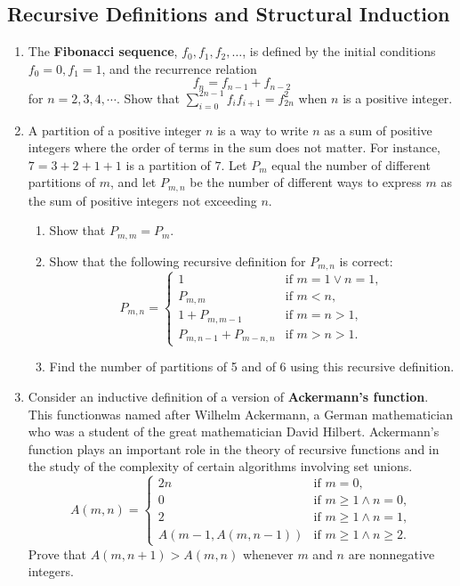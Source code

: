 \documentclass{../../cls/sig-alternate-05-2015}
\begin{document}
\subsection{Recursive Definitions and Structural Induction}
\begin{enumerate}
\item The \textbf{Fibonacci sequence},
$f_0, f_1, f_2, \ldots$,
is defined by the initial conditions $f_0 = 0, f_1 = 1$,
and the recurrence relation \begin{equation}
    f_n = f_{n - 1} + f_{n - 2}
\end{equation} for $n = 2, 3, 4, \cdots$.
Show that $\sum_{i = 0}^{2n - 1} f_i f_{i + 1} = f_{2n}^2$ when $n$ is a positive integer.

\item A partition of a positive integer $n$ is a way to write $n$ as a sum of positive integers where the order of terms in
the sum does not matter.
For instance, $7 = 3 + 2 + 1 + 1$ is a partition of $7$.
Let $P_m$ equal the number of different partitions of $m$,
and let $P_{m, n}$ be the number of different ways to express $m$ as the sum of positive integers not exceeding $n$. \begin{enumerate}
    \item Show that $P_{m, m} = P_m$.
    \item Show that the following recursive definition for $P_{m, n}$ is correct: \begin{equation}
        P_{m, n} = \begin{cases}
        1 & \text{if } m = 1 \lor n = 1,\\
        P_{m, m} & \text{if } m < n,\\
        1 + P_{m, m - 1} & \text{if } m = n > 1,\\
        P_{m, n - 1} + P_{m - n, n} & \text{if } m > n > 1.
        \end{cases}
    \end{equation}
    \item Find the number of partitions of 5 and of 6 using this recursive definition.
\end{enumerate}

\item Consider an inductive definition of a version of \textbf{Ackermann's function}.
This functionwas named after Wilhelm Ackermann,
a German mathematician who was a student of the great mathematician David Hilbert.
Ackermann's function plays an important role in the theory of recursive functions and in the study of the complexity of certain algorithms involving set unions.
\begin{equation}
    A(m, n) = \begin{cases}
    2n & \text{if } m = 0,\\
    0 & \text{if } m \ge 1 \land n = 0,\\
    2 & \text{if } m \ge 1 \land n = 1,\\
    A(m - 1, A(m, n - 1)) & \text{if } m \ge 1 \land n \ge 2.
    \end{cases}
\end{equation}
Prove that $A(m, n + 1) > A(m, n)$ whenever $m$ and $n$ are
nonnegative integers.


\end{enumerate}
\end{document}
